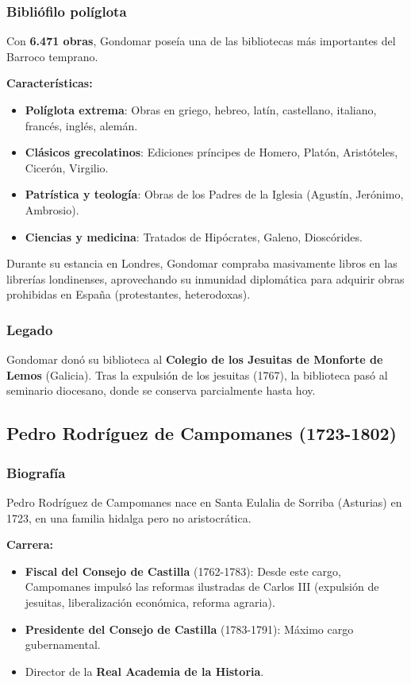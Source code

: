 \documentclass[11pt,a4paper]{article}
\begin{document}
\subsubsection{Bibliófilo políglota}

Con \textbf{6.471 obras}, Gondomar poseía una de las bibliotecas más importantes del Barroco temprano.

\textbf{Características:}
\begin{itemize}
\item \textbf{Políglota extrema}: Obras en griego, hebreo, latín, castellano, italiano, francés, inglés, alemán.
\item \textbf{Clásicos grecolatinos}: Ediciones príncipes de Homero, Platón, Aristóteles, Cicerón, Virgilio.
\item \textbf{Patrística y teología}: Obras de los Padres de la Iglesia (Agustín, Jerónimo, Ambrosio).
\item \textbf{Ciencias y medicina}: Tratados de Hipócrates, Galeno, Dioscórides.
\end{itemize}

Durante su estancia en Londres, Gondomar compraba masivamente libros en las librerías londinenses, aprovechando su inmunidad diplomática para adquirir obras prohibidas en España (protestantes, heterodoxas).

\subsubsection{Legado}

Gondomar donó su biblioteca al \textbf{Colegio de los Jesuitas de Monforte de Lemos} (Galicia). Tras la expulsión de los jesuitas (1767), la biblioteca pasó al seminario diocesano, donde se conserva parcialmente hasta hoy.

\subsection{Pedro Rodríguez de Campomanes (1723-1802)}

\subsubsection{Biografía}

Pedro Rodríguez de Campomanes nace en Santa Eulalia de Sorriba (Asturias) en 1723, en una familia hidalga pero no aristocrática.

\textbf{Carrera:}
\begin{itemize}
\item \textbf{Fiscal del Consejo de Castilla} (1762-1783): Desde este cargo, Campomanes impulsó las reformas ilustradas de Carlos III (expulsión de jesuitas, liberalización económica, reforma agraria).
\item \textbf{Presidente del Consejo de Castilla} (1783-1791): Máximo cargo gubernamental.
\item Director de la \textbf{Real Academia de la Historia}.
\end{itemize}
\end{document}
